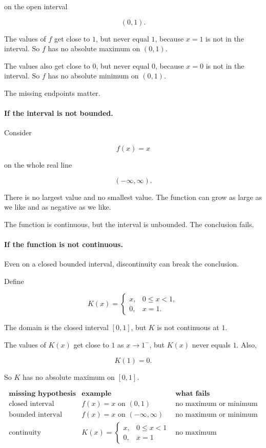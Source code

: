 on the open interval

\[
(0,1).
\]

The values of \(f\) get close to \(1\), but never equal \(1\), because \(x=1\) is not in the interval.  So \(f\) has no absolute maximum on \((0,1)\).

The values also get close to \(0\), but never equal \(0\), because \(x=0\) is not in the interval.  So \(f\) has no absolute minimum on \((0,1)\).

The missing endpoints matter.

\paragraph{If the interval is not bounded.}
Consider

\[
f(x)=x
\]

on the whole real line

\[
(-\infty,\infty).
\]

There is no largest value and no smallest value.  The function can grow as large as we like and as negative as we like.

The function is continuous, but the interval is unbounded.  The conclusion fails.

\paragraph{If the function is not continuous.}
Even on a closed bounded interval, discontinuity can break the conclusion.

Define

\[
K(x)=
\begin{cases}
x, & 0\le x<1,\\
0, & x=1.
\end{cases}
\]

The domain is the closed interval \([0,1]\), but \(K\) is not continuous at \(1\).

The values of \(K(x)\) get close to \(1\) as \(x\to1^-\), but \(K(x)\) never equals \(1\).  Also,

\[
K(1)=0.
\]

So \(K\) has no absolute maximum on \([0,1]\).

\[
\begin{array}{c|c|c}
\textbf{missing hypothesis} & \textbf{example} & \textbf{what fails} \\ \hline
\text{closed interval} &
f(x)=x\text{ on }(0,1)
&
\text{no maximum or minimum} \\[4pt]
\text{bounded interval} &
f(x)=x\text{ on }(-\infty,\infty)
&
\text{no maximum or minimum} \\[4pt]
\text{continuity} &
K(x)=
\begin{cases}
x,&0\le x<1\\
0,&x=1
\end{cases}
&
\text{no maximum}
\end{array}
\]

